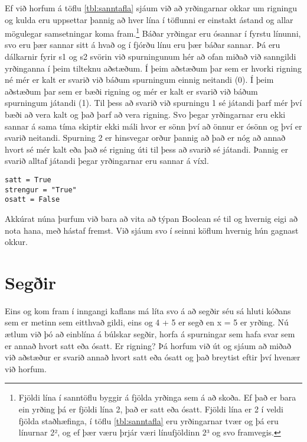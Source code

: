 Ef við horfum á töflu \ref{tbl:sanntafla} sjáum við að yrðingarnar okkar um rigningu og kulda eru uppsettar þannig að hver lína í töflunni er einstakt ástand og allar mögulegar samsetningar koma fram.\footnote{Fjöldi lína í sanntöflu byggir á fjölda yrðinga sem á að skoða.
Ef það er bara ein yrðing þá er fjöldi lína 2, það er satt eða ósatt. Fjöldi lína er 2 í veldi fjölda staðhæfinga, í töflu \ref{tbl:sanntafla} eru yrðingarnar tvær og þá eru línurnar 2², og ef þær væru þrjár væri línufjöldinn 2³ og svo framvegis.}
Báðar yrðingar eru ósannar í fyrstu línunni, svo eru þær sannar sitt á hvað og í fjórðu línu eru þær báðar sannar.
Þá eru dálkarnir fyrir s1 og s2 svörin við spurningunum hér að ofan miðað við sanngildi yrðinganna í þeim tilteknu aðstæðum.
Í þeim aðstæðum þar sem er hvorki rigning né mér er kalt er svarið við báðum spurningum einnig neitandi (0).
Í þeim aðstæðum þar sem er bæði rigning og mér er kalt er svarið við báðum spurningum játandi (1).
Til þess að svarið við spurningu 1 sé játandi þarf mér því bæði að vera kalt og það þarf að vera rigning.
Svo þegar yrðingarnar eru ekki sannar á sama tíma skiptir ekki máli hvor er sönn því að önnur er ósönn og því er svarið neitandi.
Spurning 2 er hinsvegar orður þannig að það er nóg að annað hvort sé mér kalt eða það sé rigning úti til þess að svarið sé játandi.
Þannig er svarið alltaf játandi þegar yrðingarnar eru sannar á víxl.

\begin{lstlisting}[caption=Sanngildi geymd sem breytur, label=lst:bool-breytur]
satt = True
strengur = "True"
osatt = False
\end{lstlisting}

Akkúrat núna þurfum við bara að vita að týpan Boolean sé til og hvernig eigi að nota hana, með hástaf fremst.
Við sjáum svo í seinni köflum hvernig hún gagnast okkur.


\section{Segðir}

Eins og kom fram í inngangi kaflans má líta svo á að segðir séu sá hluti kóðans sem er metinn sem eitthvað gildi, eins og 4 + 5 er segð en x = 5 er yrðing.
Nú ætlum við þó að einblína á búlskar segðir, horfa á spurningar sem hafa svar sem er annað hvort satt eða ósatt.
Er rigning?
Þá horfum við út og sjáum að miðað við aðstæður er svarið annað hvort satt eða ósatt og það breytist eftir því hvenær við horfum.

